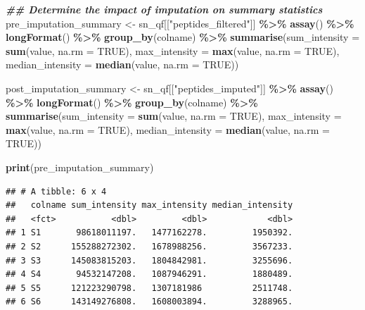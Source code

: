 \documentclass[9pt,a4paper,]{extarticle}
\newenvironment{Shaded}{\begin{snugshade}}{\end{snugshade}}
\newcommand{\AttributeTok}[1]{\textcolor[rgb]{0.13,0.29,0.53}{#1}}
\newcommand{\ConstantTok}[1]{\textcolor[rgb]{0.56,0.35,0.01}{#1}}
\newcommand{\DocumentationTok}[1]{\textcolor[rgb]{0.56,0.35,0.01}{\textbf{\textit{#1}}}}
\newcommand{\FunctionTok}[1]{\textcolor[rgb]{0.13,0.29,0.53}{\textbf{#1}}}
\newcommand{\NormalTok}[1]{#1}
\newcommand{\OtherTok}[1]{\textcolor[rgb]{0.56,0.35,0.01}{#1}}
\newcommand{\SpecialCharTok}[1]{\textcolor[rgb]{0.81,0.36,0.00}{\textbf{#1}}}
\newcommand{\StringTok}[1]{\textcolor[rgb]{0.31,0.60,0.02}{#1}}
\begin{document}
\begin{Shaded}
\begin{Highlighting}[]
\DocumentationTok{\#\# Determine the impact of imputation on summary statistics}
\NormalTok{pre\_imputation\_summary }\OtherTok{\textless{}{-}}\NormalTok{ sn\_qf[[}\StringTok{"peptides\_filtered"}\NormalTok{]] }\SpecialCharTok{\%\textgreater{}\%}
  \FunctionTok{assay}\NormalTok{() }\SpecialCharTok{\%\textgreater{}\%}
  \FunctionTok{longFormat}\NormalTok{() }\SpecialCharTok{\%\textgreater{}\%}
  \FunctionTok{group\_by}\NormalTok{(colname) }\SpecialCharTok{\%\textgreater{}\%}
  \FunctionTok{summarise}\NormalTok{(}\AttributeTok{sum\_intensity =} \FunctionTok{sum}\NormalTok{(value, }\AttributeTok{na.rm =} \ConstantTok{TRUE}\NormalTok{),}
            \AttributeTok{max\_intensity =} \FunctionTok{max}\NormalTok{(value, }\AttributeTok{na.rm =} \ConstantTok{TRUE}\NormalTok{),}
            \AttributeTok{median\_intensity =} \FunctionTok{median}\NormalTok{(value, }\AttributeTok{na.rm =} \ConstantTok{TRUE}\NormalTok{))}

\NormalTok{post\_imputation\_summary }\OtherTok{\textless{}{-}}\NormalTok{ sn\_qf[[}\StringTok{"peptides\_imputed"}\NormalTok{]] }\SpecialCharTok{\%\textgreater{}\%}
  \FunctionTok{assay}\NormalTok{() }\SpecialCharTok{\%\textgreater{}\%}
  \FunctionTok{longFormat}\NormalTok{() }\SpecialCharTok{\%\textgreater{}\%}
  \FunctionTok{group\_by}\NormalTok{(colname) }\SpecialCharTok{\%\textgreater{}\%}
  \FunctionTok{summarise}\NormalTok{(}\AttributeTok{sum\_intensity =} \FunctionTok{sum}\NormalTok{(value, }\AttributeTok{na.rm =} \ConstantTok{TRUE}\NormalTok{),}
            \AttributeTok{max\_intensity =} \FunctionTok{max}\NormalTok{(value, }\AttributeTok{na.rm =} \ConstantTok{TRUE}\NormalTok{),}
            \AttributeTok{median\_intensity =} \FunctionTok{median}\NormalTok{(value, }\AttributeTok{na.rm =} \ConstantTok{TRUE}\NormalTok{))}

\FunctionTok{print}\NormalTok{(pre\_imputation\_summary)}
\end{Highlighting}
\end{Shaded}

\begin{verbatim}
## # A tibble: 6 x 4
##   colname sum_intensity max_intensity median_intensity
##   <fct>           <dbl>         <dbl>            <dbl>
## 1 S1       98618011197.   1477162278.         1950392.
## 2 S2      155288272302.   1678988256.         3567233.
## 3 S3      145083815203.   1804842981.         3255696.
## 4 S4       94532147208.   1087946291.         1880489.
## 5 S5      121223290798.   1307181986          2511748.
## 6 S6      143149276808.   1608003894.         3288965.
\end{verbatim}
\end{document}
